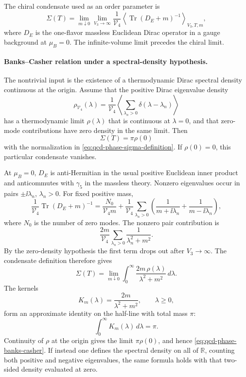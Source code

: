 \begin{definition}
\label{def:qcd-chiral-order-parameter}
The chiral condensate used as an order parameter is
\begin{equation}
  \Sigma(T)
  =
  \lim_{m\downarrow0}\lim_{V_3\to\infty}
  \frac{1}{\mathcal V_4}
  \left\langle \operatorname{Tr}(D_E+m)^{-1}\right\rangle_{V_3,T,m},
  \label{eq:qcd-phase-sigma-definition}
\end{equation}
where \(D_E\) is the one-flavor massless Euclidean Dirac operator in a gauge
background at \(\mu_B=0\).  The infinite-volume limit precedes the chiral
limit.
\end{definition}

\paragraph{Banks--Casher relation under a spectral-density hypothesis.}
The nontrivial input is the existence of a thermodynamic Dirac spectral
density continuous at the origin.  Assume that the positive Dirac eigenvalue
density
\[
  \rho_{\mathcal V_4}(\lambda)
  =
  \frac1{\mathcal V_4}\left\langle
  \sum_{\lambda_n>0}\delta(\lambda-\lambda_n)
  \right\rangle
\]
has a thermodynamic limit \(\rho(\lambda)\) that is continuous at
\(\lambda=0\), and that zero-mode contributions have zero density in the
same limit.  Then
\begin{equation}
  \Sigma(T)=\pi\rho(0)
  \label{eq:qcd-phase-banks-casher}
\end{equation}
with the normalization in
\eqref{eq:qcd-phase-sigma-definition}.  If \(\rho(0)=0\), this particular
condensate vanishes.

At \(\mu_B=0\), \(D_E\) is anti-Hermitian in the usual positive Euclidean
inner product and anticommutes with \(\gamma_5\) in the massless theory.
Nonzero eigenvalues occur in pairs \(\pm\ii\lambda_n\), \(\lambda_n>0\).
For fixed positive mass,
\[
  \frac1{\mathcal V_4}\operatorname{Tr}(D_E+m)^{-1}
  =
  \frac{N_0}{\mathcal V_4m}
  +
  \frac1{\mathcal V_4}\sum_{\lambda_n>0}
  \left(\frac1{m+\ii\lambda_n}+\frac1{m-\ii\lambda_n}\right),
\]
where \(N_0\) is the number of zero modes.  The nonzero pair contribution is
\[
  \frac{2m}{\mathcal V_4}\sum_{\lambda_n>0}\frac1{\lambda_n^2+m^2}.
\]
By the zero-density hypothesis the first term drops out after
\(V_3\to\infty\).  The condensate definition therefore gives
\[
  \Sigma(T)
  =
  \lim_{m\downarrow0}
  \int_0^\infty
  \frac{2m\,\rho(\lambda)}{\lambda^2+m^2}\,d\lambda .
\]
The kernels
\[
  K_m(\lambda)=\frac{2m}{\lambda^2+m^2},\qquad \lambda\ge0,
\]
form an approximate identity on the half-line with total mass \(\pi\):
\[
  \int_0^\infty K_m(\lambda)\,d\lambda=\pi .
\]
Continuity of \(\rho\) at the origin gives the limit
\(\pi\rho(0)\), and hence \eqref{eq:qcd-phase-banks-casher}.  If instead
one defines the spectral density on all of \(\mathbb R\), counting both
positive and negative eigenvalues, the same formula holds with that
two-sided density evaluated at zero.

